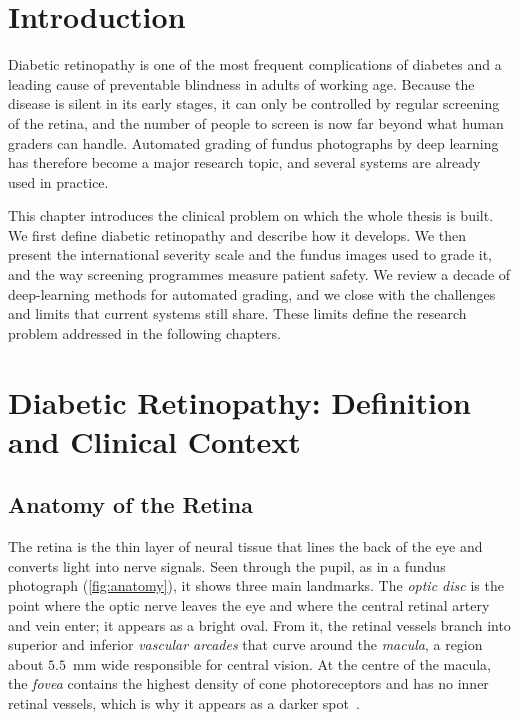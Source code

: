 \section*{Introduction}

Diabetic retinopathy is one of the most frequent complications of diabetes and a leading
cause of preventable blindness in adults of working age. Because the disease is silent in
its early stages, it can only be controlled by regular screening of the retina, and the
number of people to screen is now far beyond what human graders can handle. Automated
grading of fundus photographs by deep learning has therefore become a major research
topic, and several systems are already used in practice.

This chapter introduces the clinical problem on which the whole thesis is built. We first
define diabetic retinopathy and describe how it develops. We then present the
international severity scale and the fundus images used to grade it, and the way
screening programmes measure patient safety. We review a decade of deep-learning methods
for automated grading, and we close with the challenges and limits that current systems
still share. These limits define the research problem addressed in the following
chapters.

\section{Diabetic Retinopathy: Definition and Clinical Context}
\label{sec:burden}

\subsection{Anatomy of the Retina}
\label{sec:anatomy}

The retina is the thin layer of neural tissue that lines the back of the eye and converts
light into nerve signals. Seen through the pupil, as in a fundus photograph
(\cref{fig:anatomy}), it shows three main landmarks. The \emph{optic disc} is the point
where the optic nerve leaves the eye and where the central retinal artery and vein enter;
it appears as a bright oval. From it, the retinal vessels branch into superior and
inferior \emph{vascular arcades} that curve around the \emph{macula}, a region about
$5.5$~mm wide responsible for central vision. At the centre of the macula, the
\emph{fovea} contains the highest density of cone photoreceptors and has no inner retinal
vessels, which is why it appears as a darker spot~\cite{abramoff2010retinal}.

